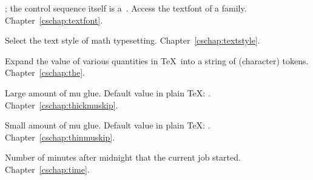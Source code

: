 \begin{glossinventory}
\item [\cs{textfont\gr{4-bit number}}]
      ; the control sequence itself
      is a~.
      Access the textfont of a family.
Chapter~\ref{cschap:textfont}.

\item [\cs{textstyle}]
      Select the text style of math typesetting.
Chapter~\ref{cschap:textstyle}.

\item [\cs{the\gr{internal quantity}}]
      Expand the value of various quantities in \TeX\ into a string
      of (character) tokens.
Chapter~\ref{cschap:the}.

\item [\cs{thickmuskip}]
      Large amount of mu glue. 
      Default value in plain \TeX: .
Chapter~\ref{cschap:thickmuskip}.

\item [\cs{thinmuskip}]
      Small amount of mu glue.
      Default value in plain \TeX: \n{3mu}.
Chapter~\ref{cschap:thinmuskip}.

\item [\cs{time}]
      Number of minutes after midnight that the current job started.
Chapter~\ref{cschap:time}.


\end{glossinventory}
